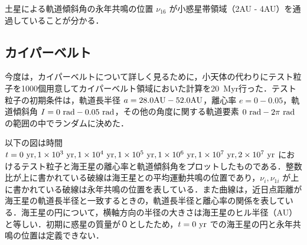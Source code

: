 \documentclass[11pt,a4paper,oneside,onecolumn]{jreport}
\begin{document}
土星による軌道傾斜角の永年共鳴の位置 $\nu_{16}$ が小惑星帯領域（2AU - 4AU）を通過していることが分かる．

\subsection{カイパーベルト}
今度は，カイパーベルトについて詳しく見るために，小天体の代わりにテスト粒子を1000個用意してカイパーベルト領域においた計算を20\ Myr行った．テスト粒子の初期条件は，軌道長半径 $a = 28.0 {\rm AU} - 52.0 {\rm AU}$，離心率 $e = 0 - 0.05$，軌道傾斜角 $I = 0\ {\rm rad} - 0.05\ {\rm rad}$，その他の角度に関する軌道要素 $0\ {\rm rad} - 2 \pi\ {\rm rad}$ の範囲の中でランダムに決めた．

以下の図は時間 $t = 0\ {\rm yr}, 1 \times 10^3\ {\rm yr}, 1 \times 10^4\ {\rm yr}, 1 \times 10^5\ {\rm yr}, 1 \times 10^6\ {\rm yr}, 1 \times 10^7\ {\rm yr}, 2 \times 10^7\ {\rm yr}$ におけるテスト粒子と海王星の離心率と軌道傾斜角をプロットしたものである．整数比が上に書かれている破線は海王星との平均運動共鳴の位置であり，$\nu_i, \nu_{1i}$ が上に書かれている破線は永年共鳴の位置を表している．また曲線は，近日点距離が海王星の軌道長半径と一致するときの，軌道長半径と離心率の関係を表している．海王星の円について，横軸方向の半径の大きさは海王星のヒル半径（AU）と等しい．初期に惑星の質量が０としたため，$t = 0\ {\rm yr}$ での海王星の円と永年共鳴の位置は定義できない．
\end{document}
